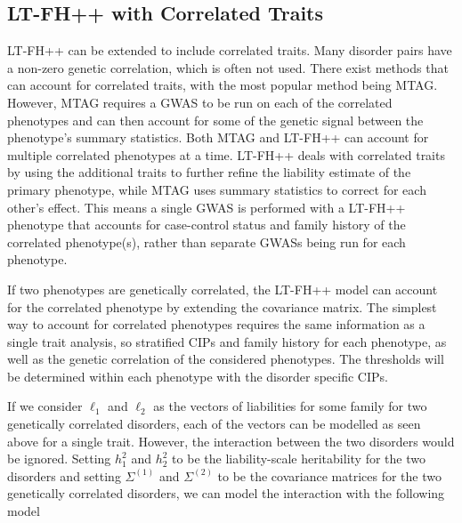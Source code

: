 \subsection{LT-FH++ with Correlated Traits} \label{sec:methods:ltfhpp:correlatedTraits}
LT-FH++ can be extended to include correlated traits. Many disorder pairs have a non-zero genetic correlation, which is often not used. There exist methods that can account for correlated traits, with the most popular method being MTAG\cite{turley2018multi}. However, MTAG requires a GWAS to be run on each of the correlated phenotypes and can then account for some of the genetic signal between the phenotype's summary statistics. Both MTAG and LT-FH++ can account for multiple correlated phenotypes at a time. LT-FH++ deals with correlated traits by using the additional traits to further refine the liability estimate of the primary phenotype, while MTAG uses summary statistics to correct for each other's effect. This means a single GWAS is performed with a LT-FH++ phenotype that accounts for case-control status and family history of the correlated phenotype(s), rather than separate GWASs being run for each phenotype. 

If two phenotypes are genetically correlated, the LT-FH++ model can account for the correlated phenotype by extending the covariance matrix. The simplest way to account for correlated phenotypes requires the same information as a single trait analysis, so stratified CIPs and family history for each phenotype, as well as the genetic correlation of the considered phenotypes. The thresholds will be determined within each phenotype with the disorder specific CIPs.

If we consider $ \ell_1 $ and $ \ell_2 $ as the vectors of liabilities for some family for two genetically correlated disorders, each of the vectors can be modelled as seen above for a single trait. However, the interaction between the two disorders would be ignored. Setting $ h_1^2 $ and $ h_2^2 $ to be the liability-scale heritability for the two disorders and setting $ \Sigma^{(1)} $ and $ \Sigma^{(2)} $ to be the covariance matrices for the two genetically correlated disorders, we can model the interaction with the following model

